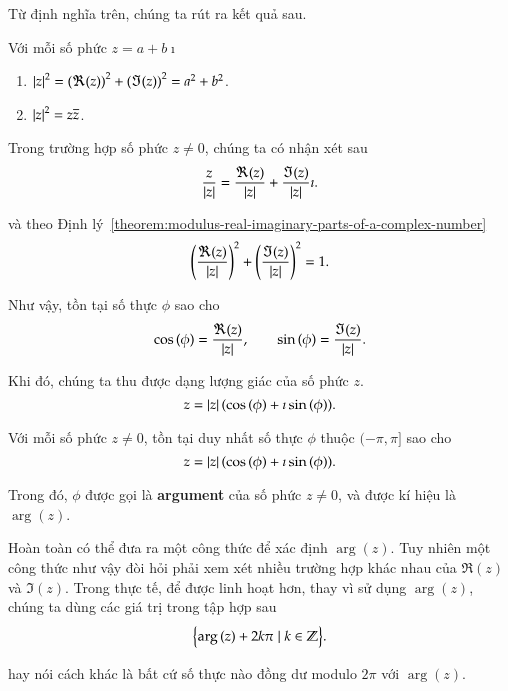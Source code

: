Từ định nghĩa trên, chúng ta rút ra kết quả sau.
\begin{theorem}\label{theorem:modulus-real-imaginary-parts-of-a-complex-number}
	Với mỗi số phức $z = a + b\imath$
	\begin{enumerate}[label={(\roman*)}]
		\item ${\left\vert{z}\right\vert}^{2} = {(\Re{(z)})}^{2} + {(\Im{(z)})}^{2} = a^{2} + b^{2}$.
		\item ${\left\vert{z}\right\vert}^{2} = z\overline{z}$.
	\end{enumerate}
\end{theorem}

Trong trường hợp số phức $z\ne 0$, chúng ta có nhận xét sau
\[
	\frac{z}{\left\vert{z}\right\vert} = \frac{\Re{(z)}}{\left\vert{z}\right\vert} + \frac{\Im{(z)}}{\left\vert{z}\right\vert}\imath.
\]

và theo Định lý~\ref{theorem:modulus-real-imaginary-parts-of-a-complex-number}
\[
	{\left(\frac{\Re{(z)}}{\left\vert{z}\right\vert}\right)}^{2} + {\left( \frac{\Im{(z)}}{\left\vert{z}\right\vert}\right)}^{2} = 1.
\]

Như vậy, tồn tại số thực $\phi$ sao cho
\[
	\cos{(\phi)} = \frac{\Re{(z)}}{\left\vert{z}\right\vert},\qquad \sin{(\phi)} = \frac{\Im{(z)}}{\left\vert{z}\right\vert}.
\]

Khi đó, chúng ta thu được dạng lượng giác của số phức $z$.
\[
	z = \left\vert{z}\right\vert(\cos{(\phi)} + \imath\sin{(\phi)}).
\]
\begin{theorem}
	Với mỗi số phức $z\ne 0$, tồn tại duy nhất số thực $\phi$ thuộc $(-\pi, \pi]$ sao cho
	\[
		z = \left\vert{z}\right\vert(\cos{(\phi)} + \imath\sin{(\phi)}).
	\]

	Trong đó, $\phi$ được gọi là \textbf{argument} của số phức $z\ne 0$, và được kí hiệu là $\arg{(z)}$.
\end{theorem}

Hoàn toàn có thể đưa ra một công thức để xác định $\arg{(z)}$. Tuy nhiên một công thức như vậy đòi hỏi phải xem xét nhiều trường hợp khác nhau của $\Re{(z)}$ và $\Im{(z)}$. Trong thực tế, để được linh hoạt hơn, thay vì sử dụng $\arg{(z)}$, chúng ta dùng các giá trị trong tập hợp sau
\[
	\Bigl\{ \arg{(z)} + 2k\pi \mid k\in\mathbb{Z} \Bigr\}.
\]

hay nói cách khác là bất cứ số thực nào đồng dư modulo $2\pi$ với $\arg{(z)}$.

